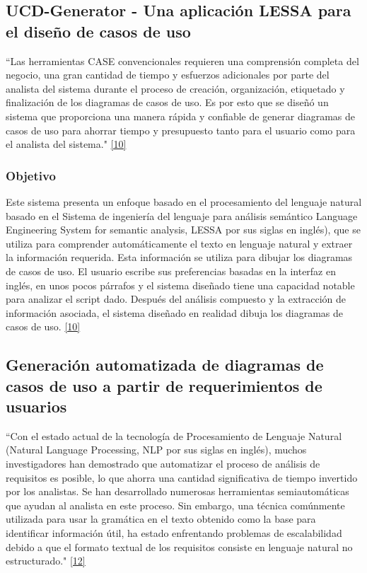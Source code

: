 \subsection{UCD-Generator - Una aplicación LESSA para el diseño de casos de uso}

``Las herramientas CASE convencionales requieren una comprensión completa del negocio, una gran cantidad de tiempo y esfuerzos adicionales por parte del analista del sistema durante el proceso de creación, organización, etiquetado y finalización de los diagramas de casos de uso. Es por esto que se diseñó un sistema que proporciona una manera rápida y confiable de generar diagramas de casos de uso para ahorrar tiempo y presupuesto tanto para el usuario como para el analista del sistema."  \hyperlink{b10}{[10]}

\subsubsection{Objetivo}
Este sistema presenta un enfoque basado en el procesamiento del lenguaje natural basado en el Sistema de ingeniería del lenguaje para análisis semántico Language Engineering System for semantic analysis, LESSA por sus siglas en inglés), que se utiliza para comprender automáticamente el texto en lenguaje natural y extraer la información requerida. Esta información se utiliza para dibujar los diagramas de casos de uso. El usuario escribe sus preferencias basadas en la interfaz en inglés, en unos pocos párrafos y el sistema diseñado tiene una capacidad notable para analizar el script dado. Después del análisis compuesto y la extracción de información asociada, el sistema diseñado en realidad dibuja los diagramas de casos de uso. \hyperlink{b10}{[10]}

\subsection{Generación automatizada de diagramas de casos de uso a partir de requerimientos de usuarios}

``Con el estado actual de la tecnología de Procesamiento de Lenguaje Natural (Natural Language Processing, NLP por sus siglas en inglés), muchos investigadores han demostrado que automatizar el proceso de análisis de requisitos es posible, lo que ahorra una cantidad significativa de tiempo invertido por los analistas. Se han desarrollado numerosas herramientas semiautomáticas que ayudan al analista en este proceso. Sin embargo, una técnica comúnmente utilizada para usar la gramática en el texto obtenido como la base para identificar información útil, ha estado enfrentando problemas de escalabilidad debido a que el formato textual de los requisitos consiste en lenguaje natural no estructurado." \hyperlink{b12}{[12]}

